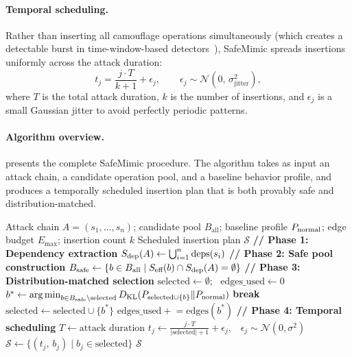 \paragraph{Temporal scheduling.}
Rather than inserting all camouflage operations simultaneously (which
creates a detectable burst in time-window-based
detectors~\cite{unicorn}), SafeMimic spreads insertions uniformly across
the attack duration:
\begin{equation}
  t_j = \frac{j \cdot T}{k+1} + \epsilon_j, \qquad
  \epsilon_j \sim \mathcal{N}(0,\, \sigma_{\text{jitter}}^2),
  \label{eq:temporal}
\end{equation}
where $T$ is the total attack duration, $k$ is the number of insertions,
and $\epsilon_j$ is a small Gaussian jitter to avoid perfectly periodic
patterns.

\paragraph{Algorithm overview.}
 presents the complete SafeMimic procedure. The
algorithm takes as input an attack chain, a candidate operation pool, and
a baseline behavior profile, and produces a temporally scheduled
insertion plan that is both provably safe and distribution-matched.

\begin{algorithm}[t]
\caption{SafeMimic: Dependency-Aware Adversarial Mimicry}
\label{alg:safemimic}
\begin{algorithmic}[1]
\Require Attack chain $A = (s_1, \ldots, s_n)$; candidate pool
         $B_{\text{all}}$; baseline profile $P_{\text{normal}}$; edge budget
         $E_{\max}$; insertion count $k$
\Ensure Scheduled insertion plan $\mathcal{S}$
\Statex
\State \textbf{// Phase 1: Dependency extraction}
\State $S_{\text{dep}}(A) \gets \bigcup_{i=1}^{n} \mathrm{deps}(s_i)$
\Statex
\State \textbf{// Phase 2: Safe pool construction}
\State $B_{\text{safe}} \gets \{b \in B_{\text{all}} \mid
        S_{\text{eff}}(b) \cap S_{\text{dep}}(A) = \emptyset\}$
\Statex
\State \textbf{// Phase 3: Distribution-matched selection}
\State $\text{selected} \gets \emptyset$;~
       $\text{edges\_used} \gets 0$
  \State $b^{*} \gets \operatorname*{arg\,min}_{b \in B_{\text{safe}} \setminus \text{selected}}
          D_{\text{KL}}(P_{\text{selected} \cup \{b\}} \| P_{\text{normal}})$
    \State \textbf{break}
  \EndIf
  \State $\text{selected} \gets \text{selected} \cup \{b^{*}\}$
  \State $\text{edges\_used} \mathrel{+}= \mathrm{edges}(b^{*})$
\EndFor
\Statex
\State \textbf{// Phase 4: Temporal scheduling}
\State $T \gets \text{attack duration}$
  \State $t_j \gets \frac{j \cdot T}{|\text{selected}| + 1}
          + \epsilon_j$,~~$\epsilon_j \sim \mathcal{N}(0, \sigma^2)$
\EndFor
\State $\mathcal{S} \gets \{(t_j,\, b_j) \mid b_j \in \text{selected}\}$
\State \Return $\mathcal{S}$
\end{algorithmic}
\end{algorithm}

